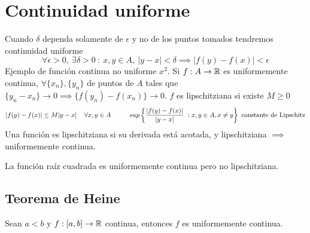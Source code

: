 \section{Continuidad uniforme}
Cuando $\delta$ dependa solamente de $\epsilon$ y no de los puntos tomados tendremos continuidad uniforme
$$ \forall\epsilon>0,\ \exists\delta>0\ : \ x,y\in A, \ |y-x|<\delta \implies |f(y)-f(x)|<\epsilon $$
Ejemplo de función continua no uniforme $x^2$. Si $f:A\rightarrow\mathbb{R}$ es uniformemente continua, $\forall \{x_n\},\{y_n\}$ de puntos de $A$ tales que $\{y_n-x_n\}\rightarrow0 \implies \{f(y_n)-f(x_n)\}\rightarrow 0$. $f$ es lipschitziana si existe $M\geq 0$
$$ |f(y)-f(x)|\leq M|y-x| \hspace{0.4cm} \forall x,y\in A\hspace{1cm} 
sup\left\{\frac{|f(y)-f(x)|}{|y-x|} \ :  x,y\in A,  x\not = y \right\} \text{ constante de Lipschitz}$$
Una función es lipschitziana si su derivada está acotada, y lipschitziana $\implies$ uniformemente continua.

La función raíz cuadrada es uniformemente continua pero no lipschitziana.

\subsection{Teorema de Heine}
Sean $a<b$ y $f:[a,b]\rightarrow\mathbb{R}$ continua, entonces $f$ es uniformemente continua.
